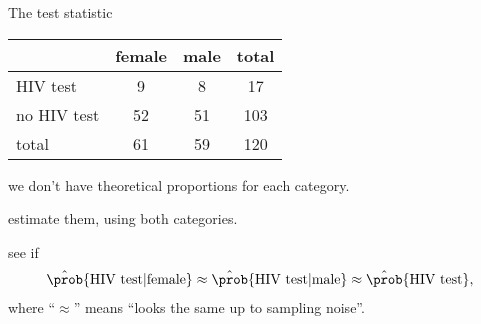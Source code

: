\begin{frame}{The test statistic}

    \begin{center}
        \begin{tabular}{lcc|c}
            & female & male & total \\
            \hline
            HIV test & 9 & 8 & 17 \\
            no HIV test & 52 & 51 & 103 \\
            \hline
            total & 61 & 59 & 120 \\
        \end{tabular}
    \end{center}

    \vspace{2em}

    we don't have theoretical proportions for each category.

    \vspace{2em}
    
    estimate them, using \alert{both} categories.

    \vspace{2em}

     see if
    \begin{align*}
        \hat \prob\{ \text{HIV test} \vert \text{female} \} 
        \approx \hat \prob\{ \text{HIV test} \vert \text{male} \}
        \approx \hat \prob\{ \text{HIV test} \},
    \end{align*}
    where ``$\approx$'' means ``looks the same up to sampling noise''.


\end{frame}


